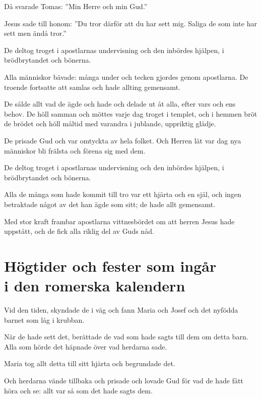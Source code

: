 Då svarade Tomas: ''Min Herre och min Gud.'' 

Jesus sade till honom: ''Du tror därför att du har sett mig. Saliga de som inte har sett men ändå tror.''


{De deltog troget i apostlarnas undervisning och den inbördes hjälpen, i brödbrytandet och bönerna. }

Alla människor bävade: många under och tecken gjordes genom apostlarna. De troende fortsatte att samlas och hade allting gemensamt. 

De sålde allt vad de ägde och hade och delade ut åt alla, efter vars och ens behov. De höll samman och möttes varje dag troget i templet, och i hemmen bröt de brödet och höll måltid med varandra i jublande, uppriktig glädje. 

De prisade Gud och var omtyckta av hela folket. Och Herren lät var dag nya människor bli frälsta och förena sig med dem.


{De deltog troget i apostlarnas undervisning och den inbördes hjälpen, i brödbrytandet och bönerna. }

Alla de många som hade kommit till tro var ett hjärta och en själ, och ingen betraktade något av det han ägde som sitt; de hade allt gemensamt. 

Med stor kraft frambar apostlarna vittnesbördet om att herren Jesus hade uppstått, och de fick alla riklig del av Guds nåd.


\newpage
\section[Högtider och fester]{Högtider och fester som ingår \\ i den romerska kalendern}

{Vid den tiden, skyndade de i väg och fann Maria och Josef och det nyfödda barnet som låg i krubban. }

När de hade sett det, berättade de vad som hade sagts till dem om detta barn. 
Alla som hörde det häpnade över vad herdarna sade. 

Maria tog allt detta till sitt hjärta och begrundade det. 

Och herdarna vände tillbaka och prisade och lovade Gud för vad de hade fått höra och se: allt var så som det hade sagts dem.

	

